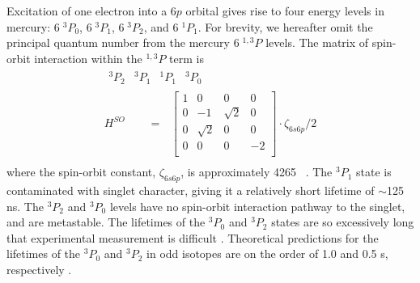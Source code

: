 Excitation of one electron into a $6p$ orbital gives rise to four
energy levels in mercury: $6 \; ^3P_0$, $6 \; ^3P_1$, $6 \; ^3P_2$,
and $6 \; ^1P_1$.  For brevity, we hereafter omit the principal
quantum number from the mercury $6 \; ^{1,3}P$ levels.  The matrix of
spin-orbit interaction within the $^{1,3}P$ term is
\begin{equation}
\begin{split}
 \begin{array}{cccc}^3P_2 & ^3P_1 & ^1P_1 & ^3P_0\end{array}
 \:\:\:\:\:\:\:\:\:\:\:\:\:\:\:\\
H^{SO} \:\:\:\:\:\:\:\:\: = \:\:\:
    \begin{bmatrix}
     1 & 0 & 0 & 0  \\
     0 & -1 & \sqrt{2} & 0 \\   
     0 & \sqrt{2} & 0 & 0 \\ 
     0 & 0 & 0 & -2 \\  
    \end{bmatrix}
  \cdot \zeta_{6s6p}/2\\
\end{split}
\end{equation}
where the spin-orbit constant, $\zeta_{6s6p}$, is approximately 4265
\rcm\ \cite{field04}.  The $^3P_1$ state is contaminated with singlet
character, giving it a relatively short lifetime of $\sim$125 ns.  The
$^3P_2$ and $^3P_0$ levels have no spin-orbit interaction pathway to
the singlet, and are metastable.  The lifetimes of the $^3P_0$ and
$^3P_2$ states are so excessively long that experimental measurement
is difficult \cite{wexler80}.  Theoretical predictions for the
lifetimes of the $^3P_0$ and $^3P_2$ in odd isotopes are on the order
of 1.0 and 0.5 s, respectively \cite{mishra01}.

